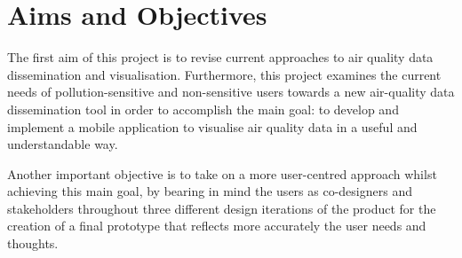 \section{Aims and Objectives}
The first aim of this project is to revise current approaches to air quality data dissemination and visualisation. Furthermore, this project examines the current needs of pollution-sensitive and non-sensitive users towards a new air-quality data dissemination tool in order to accomplish the main goal: to develop and implement a mobile application to visualise air quality data in a useful and understandable way. 

Another important objective is to take on a more user-centred approach whilst achieving this main goal, by bearing in mind the users as co-designers and stakeholders throughout three different design iterations of the product for the creation of a final prototype that reflects more accurately the user needs and thoughts.

\iffalse
DATA -> APP -> USEFUL -> PERSONAL -> DECISION SUPPORT -> DESIGNED BY PEOPLE
\fi